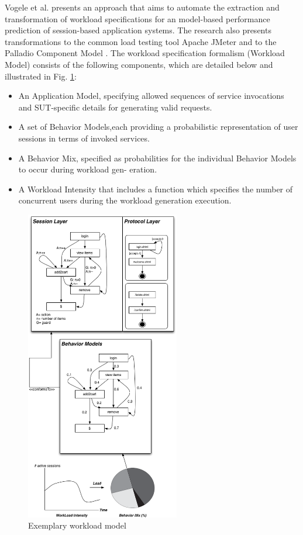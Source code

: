 Vogele et al. presents an approach that aims to automate the extraction and transformation of workload specifications for an model-based performance prediction of session-based application systems.  The research also presents transformations to the common load testing tool Apache JMeter and to the Palladio Component Model \cite{Vogele2016}. The workload specification formalism (Workload Model) consists of the following components, which are detailed below and illustrated in Fig. \ref{fig:vogel}:
\begin{itemize}
\item An Application Model, specifying allowed sequences of service invocations and SUT-specific details for generating valid requests.
\item A set of Behavior Models,each providing a probabilistic representation of user sessions in terms of invoked services.
\item A Behavior Mix, specified as probabilities for the individual Behavior Models to occur during workload gen- eration.
\item A Workload Intensity that includes a function which specifies the number of concurrent users during the workload generation execution.
\end{itemize}


\begin{figure}[!ht]
\centering
\includegraphics[width=0.6\textwidth]{./images/vogel.png}
\caption{Exemplary workload model}
\label{fig:vogel}
\end{figure}


